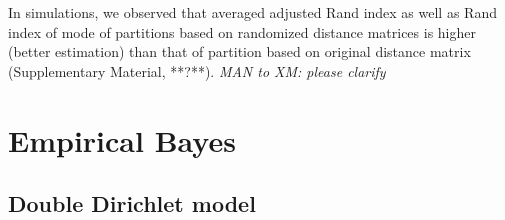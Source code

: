 \documentclass[11pt]{amsart}
\begin{document}
In simulations, 
we observed that averaged adjusted Rand index as well as Rand index of mode of partitions based on randomized distance matrices is higher (better estimation) than that of partition based on original distance matrix (Supplementary Material, **?**). 
{\em MAN to XM: please clarify}


\section{Empirical Bayes}
\subsection{Double Dirichlet model}


\end{document}
